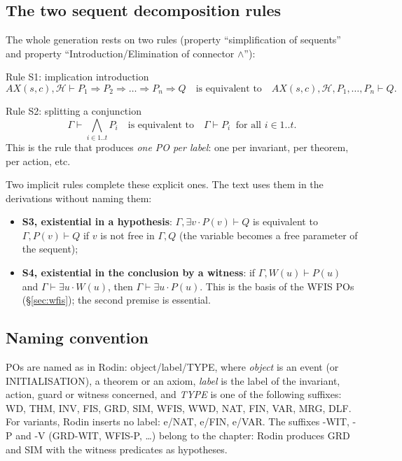 \documentclass[11pt,a4paper]{article}
\newcommand{\limp}{\Rightarrow}
\newcommand{\AX}{\mathit{AX}(s,c)}
\newcommand{\po}[1]{\textsf{\small #1}}
\begin{document}
\subsection{The two sequent decomposition rules}\label{sec:simplif}
The whole generation rests on two rules (property ``simplification of sequents''
and property ``Introduction/Elimination of connector $\wedge$''):
\begin{regle}{Rule S1: implication introduction}
  \[
    \AX, \mathcal{H} \vdash P_1 \limp P_2 \limp \dots \limp P_n \limp Q
    \quad\text{is equivalent to}\quad
    \AX, \mathcal{H}, P_1, \dots, P_n \vdash Q .
  \]
\end{regle}
\begin{regle}{Rule S2: splitting a conjunction}
  \[
    \Gamma \vdash \textstyle\bigwedge_{i\in 1..t} P_i
    \quad\text{is equivalent to}\quad
    \Gamma \vdash P_i \ \text{ for all } i\in 1..t .
  \]
  This is the rule that produces \emph{one PO per label}: one per invariant, per
  theorem, per action, etc.
\end{regle}
Two implicit rules complete these explicit ones. The text uses them in the
derivations without naming them:
\begin{itemize}
  \item \textbf{S3, existential in a hypothesis}:
    $\Gamma, \exists v\cdot P(v) \vdash Q$ is equivalent to $\Gamma, P(v)\vdash Q$
    if $v$ is not free in $\Gamma, Q$ (the variable becomes a free parameter of the
    sequent);
  \item \textbf{S4, existential in the conclusion by a witness}: if
    $\Gamma, W(u) \vdash P(u)$ and $\Gamma\vdash\exists u\cdot W(u)$, then
    $\Gamma\vdash\exists u\cdot P(u)$. This is the basis of the \po{WFIS} POs
    (§\ref{sec:wfis}); the second premise is essential.
\end{itemize}

\subsection{Naming convention}
POs are named as in Rodin: \po{object/label/TYPE}, where \emph{object} is an event
(or \po{INITIALISATION}), a theorem or an axiom, \emph{label} is the label of the
invariant, action, guard or witness concerned, and \emph{TYPE} is one of the
following suffixes: \po{WD}, \po{THM}, \po{INV}, \po{FIS}, \po{GRD}, \po{SIM},
\po{WFIS}, \po{WWD}, \po{NAT}, \po{FIN}, \po{VAR}, \po{MRG}, \po{DLF}. For variants,
Rodin inserts no label: \po{e/NAT}, \po{e/FIN}, \po{e/VAR}. The suffixes \po{-WIT},
\po{-P} and \po{-V} (\po{GRD-WIT}, \po{WFIS-P}, \dots) belong to the chapter: Rodin
produces \po{GRD} and \po{SIM} with the witness predicates as hypotheses.
\end{document}

